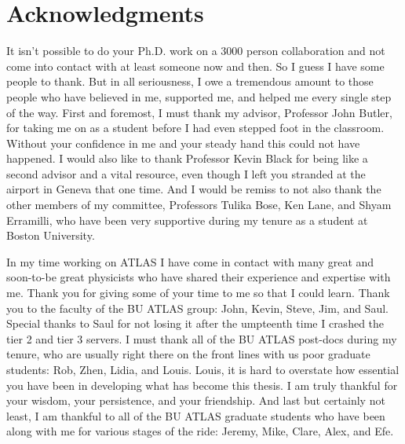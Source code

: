 \section*{Acknowledgments}

It isn't possible to do your Ph.D. work on a 3000 person collaboration and not 
come into contact with at least someone now and then. So I guess I have some people to thank.
But in all seriousness, I owe a tremendous amount to those people who have believed in me,
supported me, and helped me every single step of the way. First and foremost, I must
thank my advisor, Professor John Butler, for taking me on as a student before I had even stepped
foot in the classroom. Without your confidence in me and your steady hand
this could not have happened. I would also like to thank Professor Kevin Black
for being like a second advisor and a vital resource, even though
I left you stranded at the airport in Geneva that one time.
And I would be remiss to not also thank the other members of my committee, Professors Tulika
Bose, Ken Lane, and Shyam Erramilli, who have been very supportive
during my tenure as a student at Boston University. 


In my time working on ATLAS I have come in contact with many great and soon-to-be great 
physicists  who have shared their experience and expertise with me. Thank you for 
giving some of your time to me so that I could learn. 
Thank you to the faculty of the BU ATLAS group: John, Kevin, Steve, Jim, and Saul.
Special thanks to Saul for not losing it after the umpteenth time I crashed 
the tier 2 and tier 3 servers.
I must thank all of the BU ATLAS post-docs during my tenure, who are usually 
right there on the front lines with us poor graduate students: Rob, Zhen, Lidia, and Louis.
Louis, it is hard to overstate how essential you have been in developing what has become this thesis.
I am truly thankful for your wisdom, your persistence, and your friendship.
And last but certainly not least, I am thankful to all of the BU ATLAS graduate students 
who have been along with me for various stages of the ride: Jeremy, Mike, Clare, Alex, and Efe.


